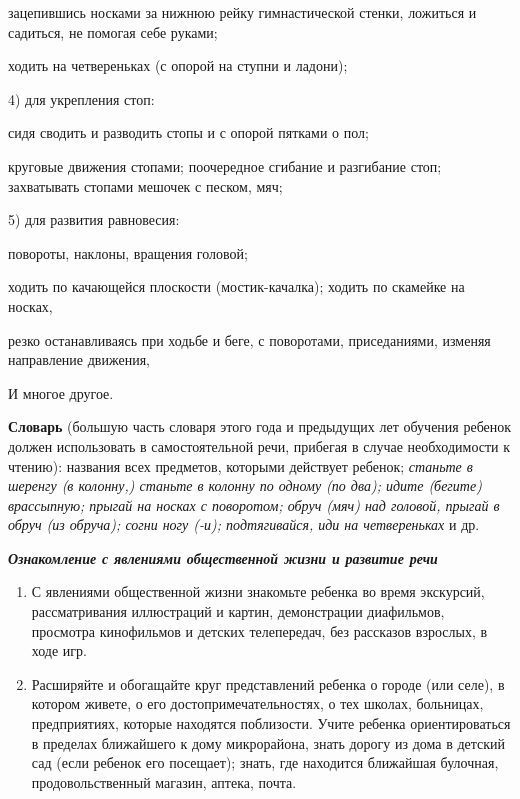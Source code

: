 \documentclass[a5paper]{book}
\renewcommand{\emph}[1]{\textit{#1}}
\begin{document}
зацепившись носками за нижнюю рейку гимнастической стенки, ложиться и
садиться, не помогая себе руками;

ходить на четвереньках (с опорой на ступни и ладони);

4) для укрепления стоп:

сидя сводить и разводить стопы и с опорой пятками о пол;

круговые движения стопами; поочередное сгибание и разгибание стоп;
захватывать стопами мешочек с песком, мяч;

5) для развития равновесия:

повороты, наклоны, вращения головой;

ходить по качающейся плоскости (мостик-качалка); ходить по скамейке на
носках,

резко останавливаясь при ходьбе и беге, с поворотами, приседаниями,
изменяя направление движения,

И многое другое.

\textbf{Словарь} (большую часть словаря этого года и предыдущих лет
обучения ребенок должен использовать в самостоятельной речи, прибегая в
случае необходимости к чтению): названия всех предметов, которыми
действует ребенок; \emph{станьте в шеренгу (в колонну,) станьте в
колонну по одному (по два); идите (бегите) врассыпную; прыгай на носках
с поворотом; обруч (мяч) над головой, прыгай в обруч (из обруча); согни
ногу (-и); подтягивайся, иди на четвереньках} и др.

\emph{\textbf{Ознакомление с явлениями общественной жизни и развитие
речи}}


\begin{enumerate}
\def\labelenumi{\arabic{enumi}.}
\item
  
  С явлениями общественной жизни знакомьте ребенка во время экскурсий,
  рассматривания иллюстраций и картин, демонстрации диафильмов,
  просмотра кинофильмов и детских телепередач, без рассказов взрослых, в
  ходе игр.
  
\item
  
  Расширяйте и обогащайте круг представлений ребенка о городе (или
  селе), в котором живете, о его достопримечательностях, о тех школах,
  больницах, предприятиях, которые находятся поблизости. Учите ребенка
  ориентироваться в пределах ближайшего к дому микрорайона, знать дорогу
  из дома в детский сад (если ребенок его посещает); знать, где
  находится ближайшая булочная, продовольственный магазин, аптека,
  почта.
  
\end{enumerate}
\end{document}
